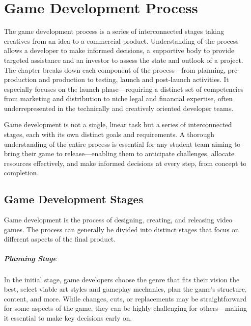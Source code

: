 \chapter{Game Development Process}

\begin{chapterabstract}
	The game development process is a series of interconnected stages taking creatives from an idea to a commercial product. Understanding of the process allows a developer to make informed decisions, a supportive body to provide targeted assistance and an investor to assess the state and outlook of a project. The chapter breaks down each component of the process---from planning, pre-production and production to testing, launch and post-launch activities. It especially focuses on the launch phase---requiring a distinct set of competencies from marketing and distribution to niche legal and financial expertise, often underrepresented in the technically and creatively oriented developer teams.
\end{chapterabstract}

Game development is not a single, linear task but a series of interconnected stages, each with its own distinct goals and requirements. A thorough understanding of the entire process is essential for any student team aiming to bring their game to release---enabling them to anticipate challenges, allocate resources effectively, and make informed decisions at every step, from concept to completion.

\section{Game Development Stages}
Game development is the process of designing, creating, and releasing video games. The process can generally be divided into distinct stages that focus on different aspects of the final product.
\cite{bramble_7-stages, rocket_6-stages}

\paragraph{Planning Stage}
In the initial stage, game developers choose the genre that fits their vision the best, select viable art styles and gameplay mechanics, plan the game’s structure, content, and more. While changes, cuts, or replacements may be straightforward for some aspects of the game, they can be highly challenging for others—making it essential to make key decisions early on.
\cite{bramble_7-stages, rocket_6-stages}

